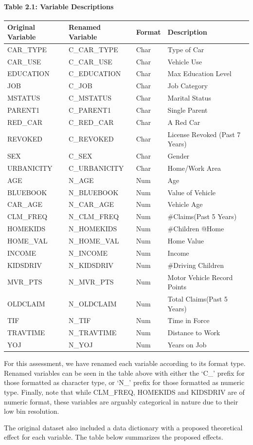\documentclass[]{article}
\let\oldparagraph\paragraph
\renewcommand{\paragraph}[1]{\oldparagraph{#1}\mbox{}}
\begin{document}
\paragraph{Table 2.1: Variable
Descriptions}\label{table-2.1-variable-descriptions}

\begin{longtable}[]{@{}llll@{}}
\toprule
Original Variable & Renamed Variable & Format &
Description\tabularnewline
\midrule
\endhead
CAR\_TYPE & C\_CAR\_TYPE & Char & Type of Car\tabularnewline
CAR\_USE & C\_CAR\_USE & Char & Vehicle Use\tabularnewline
EDUCATION & C\_EDUCATION & Char & Max Education Level\tabularnewline
JOB & C\_JOB & Char & Job Category\tabularnewline
MSTATUS & C\_MSTATUS & Char & Marital Status\tabularnewline
PARENT1 & C\_PARENT1 & Char & Single Parent\tabularnewline
RED\_CAR & C\_RED\_CAR & Char & A Red Car\tabularnewline
REVOKED & C\_REVOKED & Char & License Revoked (Past 7
Years)\tabularnewline
SEX & C\_SEX & Char & Gender\tabularnewline
URBANICITY & C\_URBANICITY & Char & Home/Work Area\tabularnewline
AGE & N\_AGE & Num & Age\tabularnewline
BLUEBOOK & N\_BLUEBOOK & Num & Value of Vehicle\tabularnewline
CAR\_AGE & N\_CAR\_AGE & Num & Vehicle Age\tabularnewline
CLM\_FREQ & N\_CLM\_FREQ & Num & \#Claims(Past 5 Years)\tabularnewline
HOMEKIDS & N\_HOMEKIDS & Num & \#Children @Home\tabularnewline
HOME\_VAL & N\_HOME\_VAL & Num & Home Value\tabularnewline
INCOME & N\_INCOME & Num & Income\tabularnewline
KIDSDRIV & N\_KIDSDRIV & Num & \#Driving Children\tabularnewline
MVR\_PTS & N\_MVR\_PTS & Num & Motor Vehicle Record
Points\tabularnewline
OLDCLAIM & N\_OLDCLAIM & Num & Total Claims(Past 5 Years)\tabularnewline
TIF & N\_TIF & Num & Time in Force\tabularnewline
TRAVTIME & N\_TRAVTIME & Num & Distance to Work\tabularnewline
YOJ & N\_YOJ & Num & Years on Job\tabularnewline
\bottomrule
\end{longtable}

For this assessment, we have renamed each variable according to its
format type. Renamed variables can be seen in the table above with
either the `C\_' prefix for those formatted as character type, or `N\_'
prefix for those formatted as numeric type. Finally, note that while
CLM\_FREQ, HOMEKIDS and KIDSDRIV are of numeric format, these variables
are arguably categorical in nature due to their low bin resolution.

The original dataset also included a data dictionary with a proposed
theoretical effect for each variable. The table below summarizes the
proposed effects.
\end{document}

